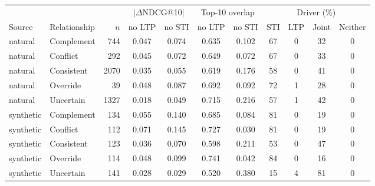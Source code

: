 \begin{tabular}{llr cc cc cccc}
\toprule
& & & \multicolumn{2}{c}{$|\Delta$NDCG@10$|$} & \multicolumn{2}{c}{Top-10 overlap} & \multicolumn{4}{c}{Driver (\%)} \\
\cmidrule(lr){4-5}\cmidrule(lr){6-7}\cmidrule(lr){8-11}
Source & Relationship & $n$ & no LTP & no STI & no LTP & no STI & STI & LTP & Joint & Neither \\
\midrule
natural & Complement & 744 & 0.047 & 0.074 & 0.635 & 0.102 & 67 & 0 & 32 & 0 \\
natural & Conflict & 292 & 0.045 & 0.072 & 0.649 & 0.072 & 67 & 0 & 33 & 0 \\
natural & Consistent & 2070 & 0.035 & 0.055 & 0.619 & 0.176 & 58 & 0 & 41 & 0 \\
natural & Override & 39 & 0.048 & 0.087 & 0.692 & 0.092 & 72 & 1 & 28 & 0 \\
natural & Uncertain & 1327 & 0.018 & 0.049 & 0.715 & 0.216 & 57 & 1 & 42 & 0 \\
synthetic & Complement & 134 & 0.055 & 0.140 & 0.685 & 0.084 & 81 & 0 & 19 & 0 \\
synthetic & Conflict & 112 & 0.071 & 0.145 & 0.727 & 0.030 & 81 & 0 & 19 & 0 \\
synthetic & Consistent & 123 & 0.036 & 0.070 & 0.598 & 0.211 & 53 & 0 & 47 & 0 \\
synthetic & Override & 114 & 0.048 & 0.099 & 0.741 & 0.042 & 84 & 0 & 16 & 0 \\
synthetic & Uncertain & 141 & 0.028 & 0.029 & 0.520 & 0.380 & 15 & 4 & 81 & 0 \\
\bottomrule
\end{tabular}
